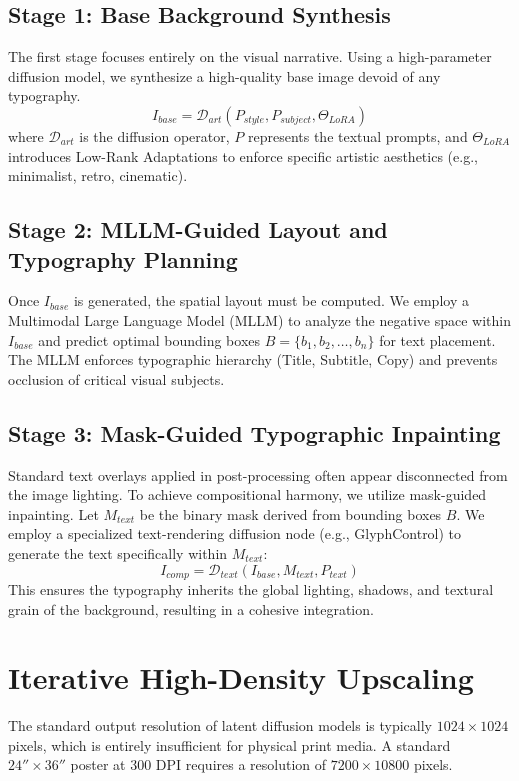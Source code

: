 \documentclass[10pt,journal,compsoc]{IEEEtran}
\begin{document}
\subsection{Stage 1: Base Background Synthesis}
The first stage focuses entirely on the visual narrative. Using a high-parameter diffusion model, we synthesize a high-quality base image devoid of any typography.
\[ I_{base} = \mathcal{D}_{art}(P_{style}, P_{subject}, \Theta_{LoRA}) \]
where $\mathcal{D}_{art}$ is the diffusion operator, $P$ represents the textual prompts, and $\Theta_{LoRA}$ introduces Low-Rank Adaptations to enforce specific artistic aesthetics (e.g., minimalist, retro, cinematic).

\subsection{Stage 2: MLLM-Guided Layout and Typography Planning}
Once $I_{base}$ is generated, the spatial layout must be computed. We employ a Multimodal Large Language Model (MLLM) to analyze the negative space within $I_{base}$ and predict optimal bounding boxes $B = \{b_1, b_2, \dots, b_n\}$ for text placement. The MLLM enforces typographic hierarchy (Title, Subtitle, Copy) and prevents occlusion of critical visual subjects.

\subsection{Stage 3: Mask-Guided Typographic Inpainting}
Standard text overlays applied in post-processing often appear disconnected from the image lighting. To achieve compositional harmony, we utilize mask-guided inpainting.
Let $M_{text}$ be the binary mask derived from bounding boxes $B$. We employ a specialized text-rendering diffusion node (e.g., GlyphControl) to generate the text specifically within $M_{text}$:
\[ I_{comp} = \mathcal{D}_{text}(I_{base}, M_{text}, P_{text}) \]
This ensures the typography inherits the global lighting, shadows, and textural grain of the background, resulting in a cohesive integration.

\section{Iterative High-Density Upscaling}
The standard output resolution of latent diffusion models is typically $1024 \times 1024$ pixels, which is entirely insufficient for physical print media. A standard $24'' \times 36''$ poster at 300 DPI requires a resolution of $7200 \times 10800$ pixels.
\end{document}
